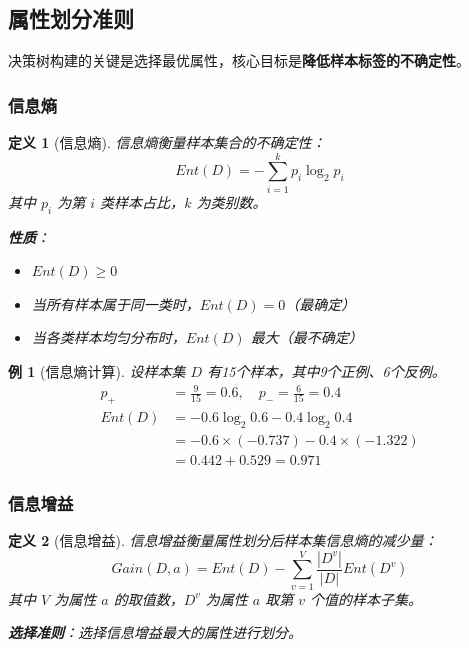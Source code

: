\documentclass[12pt,a4paper]{ctexart}
\newtheorem{definition}{定义}[section]
\newtheorem{example}{例}[section]
\begin{document}
\subsection{属性划分准则}

决策树构建的关键是选择最优属性，核心目标是\textbf{降低样本标签的不确定性}。

\subsubsection{信息熵}

\begin{definition}[信息熵]
信息熵衡量样本集合的不确定性：
\[
Ent(D) = -\sum_{i=1}^{k} p_i \log_2 p_i
\]
其中 $p_i$ 为第 $i$ 类样本占比，$k$ 为类别数。

\textbf{性质}：
\begin{itemize}
    \item $Ent(D) \geq 0$
    \item 当所有样本属于同一类时，$Ent(D) = 0$（最确定）
    \item 当各类样本均匀分布时，$Ent(D)$ 最大（最不确定）
\end{itemize}
\end{definition}

\begin{example}[信息熵计算]
设样本集 $D$ 有15个样本，其中9个正例、6个反例。
\begin{align*}
p_+ &= \frac{9}{15} = 0.6, \quad p_- = \frac{6}{15} = 0.4 \\
Ent(D) &= -0.6\log_2 0.6 - 0.4\log_2 0.4 \\
&= -0.6 \times (-0.737) - 0.4 \times (-1.322) \\
&= 0.442 + 0.529 = 0.971
\end{align*}
\end{example}

\subsubsection{信息增益}

\begin{definition}[信息增益]
信息增益衡量属性划分后样本集信息熵的减少量：
\[
Gain(D, a) = Ent(D) - \sum_{v=1}^{V} \frac{|D^v|}{|D|} Ent(D^v)
\]
其中 $V$ 为属性 $a$ 的取值数，$D^v$ 为属性 $a$ 取第 $v$ 个值的样本子集。

\textbf{选择准则}：选择信息增益最大的属性进行划分。
\end{definition}
\end{document}
